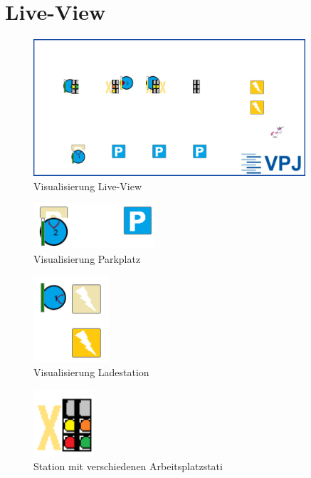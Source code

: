 \section{Live-View}

\begin{figure}[htb]
    \centering
    \includegraphics[width=0.9\textwidth]{Abbildungen/LiveView.png}
    \caption{Visualisierung Live-View}		
    \label{fig:LiveView}
\end{figure}

\begin{figure}[htb]
    \centering
    \includegraphics[width=0.4\textwidth]{Abbildungen/Parkplatz.png}
    \caption{Visualisierung Parkplatz}		
    \label{fig:Parkplatz}
\end{figure}

\begin{figure}[htb]
    \centering
    \includegraphics[width=0.25\textwidth]{Abbildungen/Laden.png}
    \caption{Visualisierung Ladestation}		
    \label{fig:Ladestation}
\end{figure}

\begin{figure}[htb]
    \centering
    \includegraphics[width=0.2\textwidth]{Abbildungen/Station.png}
    \caption{Station mit verschiedenen Arbeitsplatzstati}		
    \label{fig:Station}
\end{figure}

